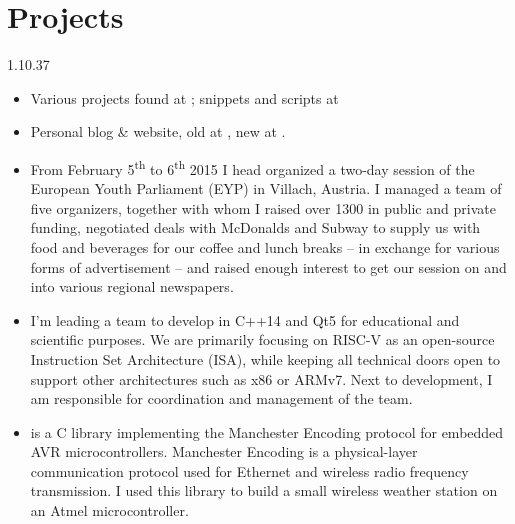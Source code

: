 \section{Projects}{1.1}{0.37}
\vspace{-5mm}
\begin{itemize}
	\item Various projects found at
	; snippets and scripts at 
	\item Personal blog \& website, old at , new at .
  \item From February 5\textsuperscript{th} to 6\textsuperscript{th} 2015 I head organized a two-day session of the European Youth Parliament (EYP) in Villach, Austria. I managed a team of five organizers, together with whom I raised over \EURdig{}1300 in public and private funding, negotiated deals with McDonalds and Subway to supply us with food and beverages for our coffee and lunch breaks -- in exchange for various forms of advertisement -- and raised enough interest to get our session on  and into various regional newspapers.
  \item I'm leading a team to develop  in C++14 and Qt5 for educational and scientific purposes. We are primarily focusing on RISC-V as an open-source Instruction Set Architecture (ISA), while keeping all technical doors open to support other architectures such as x86 or ARMv7. Next to development, I am responsible for coordination and management of the team.
  \item {} is a C library implementing the Manchester Encoding protocol for embedded AVR microcontrollers. Manchester Encoding is a physical-layer communication protocol used for Ethernet and wireless radio frequency transmission. I used this library to build a small wireless weather station on an Atmel microcontroller.

\end{itemize}
